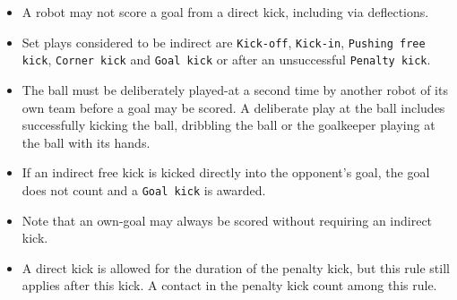 \begin{itemize}
  \item A robot may not score a goal from a direct kick, including via deflections.
  \item Set plays considered to be indirect are \texttt{Kick-off}, \texttt{Kick-in}, \texttt{Pushing free kick}, \texttt{Corner kick} and \texttt{Goal kick} or after an unsuccessful \texttt{Penalty kick}.
  \item The ball must be deliberately played-at a second time by another robot of its own team before a goal may be scored.
    A deliberate play at the ball includes successfully kicking the ball, dribbling the ball or the goalkeeper playing at the ball with its hands.
  \item If an indirect free kick is kicked directly into the opponent's goal, the goal does not count and a \texttt{Goal kick} is awarded.
  \item Note that an own-goal may always be scored without requiring an indirect kick.
  \item A direct kick is allowed for the duration of the penalty kick, but this rule still applies after this kick. A contact in the penalty kick count among this rule.  
\end{itemize}

